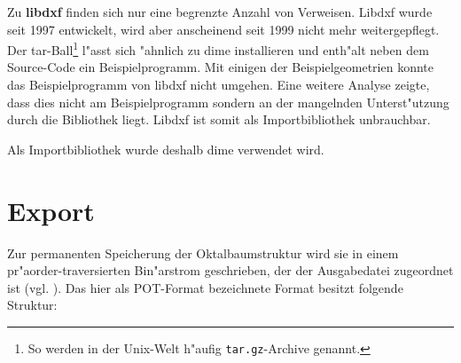 Zu \textbf{libdxf} finden sich nur eine begrenzte Anzahl von Verweisen. 
Libdxf wurde seit 1997 entwickelt, wird aber anscheinend seit 1999 nicht
mehr weitergepflegt. Der tar-Ball\footnote{So werden in der Unix-Welt h"aufig 
\texttt{tar.gz}-Archive genannt.} l"asst sich "ahnlich zu dime installieren 
und enth"alt neben dem Source-Code ein Beispielprogramm. Mit einigen der 
Beispielgeometrien konnte das Beispielprogramm von libdxf nicht umgehen. 
Eine weitere Analyse zeigte, dass dies nicht am Beispielprogramm sondern 
an der mangelnden Unterst"utzung durch die Bibliothek liegt. Libdxf ist somit 
als Importbibliothek unbrauchbar.

Als Importbibliothek wurde deshalb dime verwendet wird.

\section{Export}
\label{export_pot}

Zur permanenten Speicherung der Oktalbaumstruktur wird sie in einem 
pr"aorder-traversierten Bin"arstrom geschrieben, der der Ausgabedatei 
zugeordnet ist (vgl. ). 
Das hier als POT-Format bezeichnete Format besitzt folgende Struktur:  

